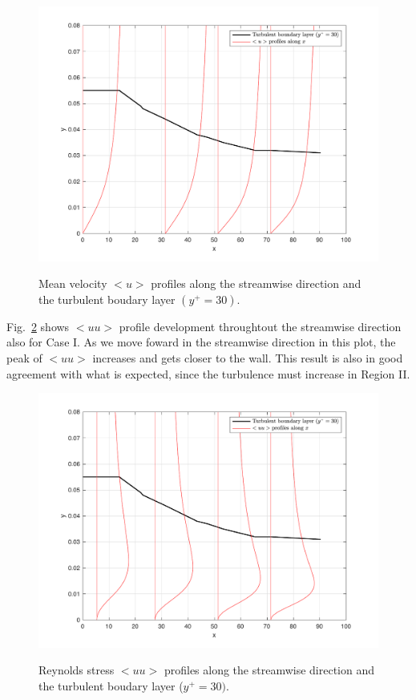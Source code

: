 \documentclass[twocolumn,10pt]{asme2e}
\begin{document}
\begin{figure}[t]
\centering
\scalebox{0.5}
{\includegraphics{u_CI.pdf}}
\caption{Mean velocity \(<u>\) profiles along the streamwise direction and the turbulent boudary layer \((y^+=30)\).}
\label{fig:u_CI}
\end{figure}

Fig.~\ref{fig:uu_CI} shows \(<uu>\) profile development throughtout the streamwise direction also for Case I. As we move foward in the streamwise direction in this plot, the peak of \(<uu>\) increases and gets closer to the wall. This result is also in good agreement with what is expected, since the turbulence must increase in Region II.

\begin{figure}[t]
\centering
\scalebox{0.5}
{\includegraphics{uu_CI.pdf}}
\caption{Reynolds stress \(<uu>\) profiles along the streamwise direction and the turbulent boudary layer (\(y^+=30)\).}
\label{fig:uu_CI}
\end{figure}
\end{document}
